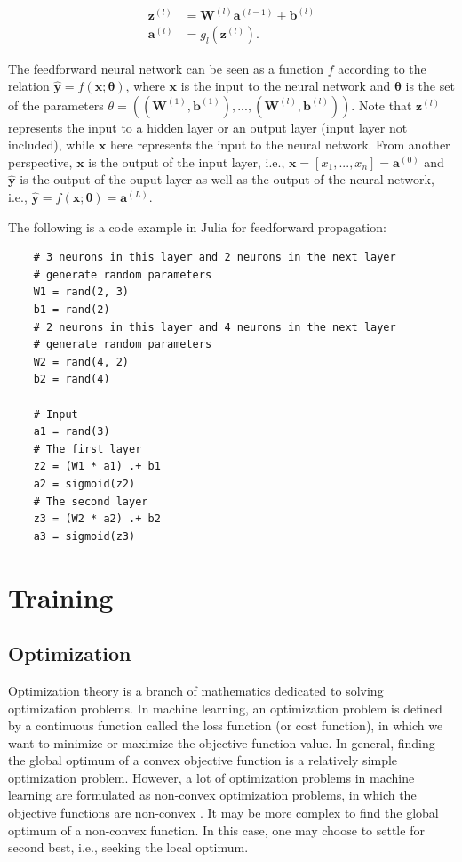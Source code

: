 \documentclass[
	parskip, 			   %
	twoside, 			   %
	DIV=14, 			   %
	BCOR=15.0mm, 		   %
	headsepline, 		   %
	open=right, 		   %
	captions=tableheading, %
	bibliography=totoc,    %
	numbers=noenddot       %
]{scrreprt}
\begin{document}
\begin{equation}
    \label{eq:input_output_neuron}
    \begin{aligned}
    \mathbf{z}^{(l)} &= \mathbf{W}^{(l)} \mathbf{a}^{(l-1)} + \mathbf{b}^{(l)}\\
    \mathbf{a}^{(l)} &= g_{l}(\mathbf{z}^{(l)}).
    \end{aligned}
\end{equation}

The feedforward neural network can be seen as a function $f$ according to the relation $\hat{\mathbf{y}} = f(\mathbf{x};\mathbf{\theta})$, where $\mathbf{x}$ is the input to the neural network and $\mathbf{\theta}$ is the set of the parameters $\theta=((\mathbf{W}^{(1)}, \mathbf{b}^{(1)}), ..., (\mathbf{W}^{(l)}, \mathbf{b}^{(l)}))$. Note that $\mathbf{z}^{(l)}$ represents the input to a hidden layer or an output layer (input layer not included), while $\mathbf{x}$ here represents the input to the neural network. From another perspective, $\mathbf{x}$ is the output of the input layer, i.e., $\mathbf{x}=[x_1, ..., x_n]=\mathbf{a}^{(0)}$ and $\hat{\mathbf{y}}$ is the output of the ouput layer as well as the output of the neural network, i.e., $\hat{\mathbf{y}}=f(\mathbf{x};\mathbf{\theta})=\mathbf{a}^{(L)}$. 

The following is a code example in Julia for feedforward propagation:

\begin{verbatim}
    # 3 neurons in this layer and 2 neurons in the next layer
    # generate random parameters
    W1 = rand(2, 3)
    b1 = rand(2)
    # 2 neurons in this layer and 4 neurons in the next layer
    # generate random parameters
    W2 = rand(4, 2)
    b2 = rand(4)
    
    # Input
    a1 = rand(3)
    # The first layer
    z2 = (W1 * a1) .+ b1
    a2 = sigmoid(z2)
    # The second layer
    z3 = (W2 * a2) .+ b2
    a3 = sigmoid(z3)
\end{verbatim}

\section{Training}

\subsection{Optimization}
Optimization theory is a branch of mathematics dedicated to solving optimization problems. In machine learning, an optimization problem is defined by a continuous function called the loss function (or cost function), in which we want to minimize or maximize the objective function value. In general, finding the global optimum of a convex objective function is a relatively simple optimization problem. However, a lot of optimization problems in machine learning are formulated as non-convex optimization problems, in which the objective functions are non-convex \cite{sun2019survey}. It may be more complex to find the global optimum of a non-convex function. In this case, one may choose to settle for second best, i.e., seeking the local optimum.
\end{document}
